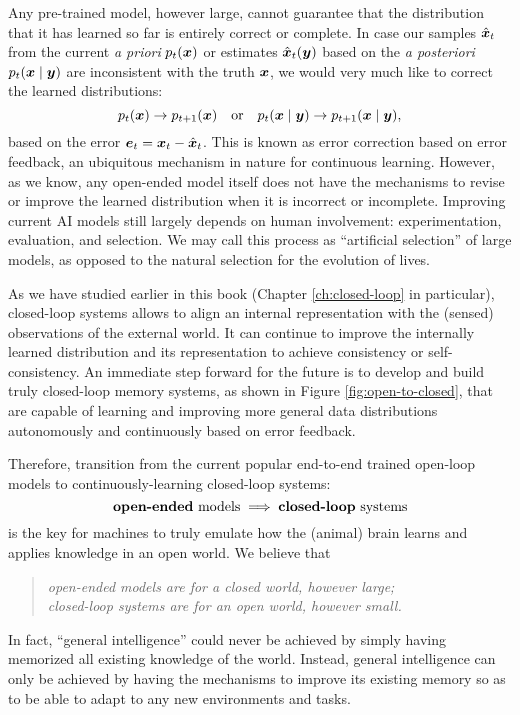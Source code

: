 \documentclass[\toplevelprefix/book-main.tex]{subfiles}
\begin{document}
Any pre-trained model, however large, cannot guarantee that the distribution that it has learned so far is entirely correct or complete. In case our samples  $\hat{\bm{x}}_t$ from the current {\em a priori} $p_t(\bm{x})$ or estimates $\hat{\bm{x}}_t(\bm{y})$ based on the {\em a posteriori} $p_t(\bm{x}\mid \bm{y})$ are inconsistent with the truth $\bm{x}$, we would very much like to correct the learned distributions:
\begin{equation}
    p_t(\bm{x}) \rightarrow p_{t+1}(\bm{x}) \quad \mbox{or}\quad p_t(\bm{x}\mid \bm{y}) \rightarrow p_{t+1}(\bm{x}\mid \bm{y}),
\end{equation}
based on the error $\boldsymbol{e}_t = \bm{x}_t - \hat{\bm{x}}_t$. This is known as error correction based on error feedback, an ubiquitous mechanism in nature for continuous learning. However, as we know, any open-ended model itself does not have the mechanisms to revise or improve the learned distribution when it is incorrect or incomplete. Improving current AI models still largely depends on human involvement: experimentation, evaluation, and selection. We may call this process as ``artificial selection'' of large models, as opposed to the natural selection for the evolution of lives. 

As we have studied earlier in this book (Chapter \ref{ch:closed-loop} in particular), closed-loop systems allows to align an internal representation with the (sensed) observations of the external world. It can continue to improve the internally learned distribution and its representation to achieve consistency or self-consistency. An immediate step forward for the future is to develop and build truly closed-loop memory systems, as shown in Figure \ref{fig:open-to-closed}, that are capable of learning and improving more general data distributions autonomously and continuously based on error feedback. 

Therefore, transition from the current popular end-to-end trained open-loop models to continuously-learning closed-loop systems:
\begin{equation}
   \mbox{\textbf{open-ended} models} \; \Longrightarrow \; 
   \mbox{\textbf{closed-loop} systems}
\end{equation}
is the key for machines to truly emulate how the (animal) brain learns and applies knowledge in an open world. We believe that
\begin{quote}
\begin{center}
        {\em open-ended models are for a closed world, however large; \\ closed-loop systems are for an open world, however small.}
\end{center}
\end{quote}
In fact, ``general intelligence'' could never be achieved by simply having memorized all existing knowledge of the world. Instead, general intelligence can only be achieved by having the mechanisms to improve its existing memory so as to be able to adapt to any new environments and tasks. 
\end{document}
